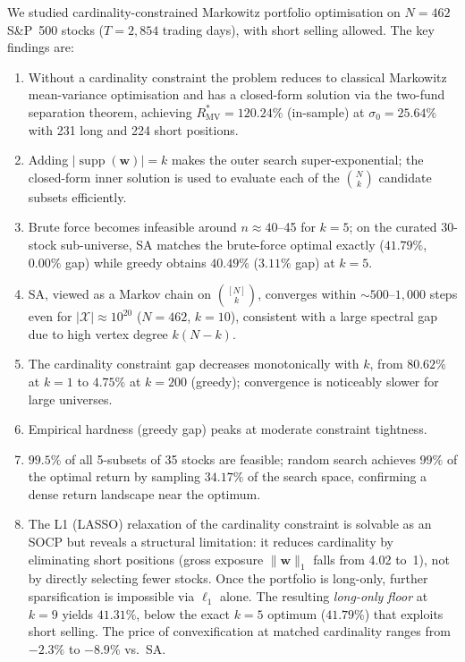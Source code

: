 \documentclass[11pt]{article}
\begin{document}
We studied cardinality-constrained Markowitz portfolio optimisation on $N=462$
S\&P~500 stocks ($T=2{,}854$ trading days), with short selling allowed.
The key findings are:
\begin{enumerate}[leftmargin=1.5em]
  \item Without a cardinality constraint the problem reduces to classical
    Markowitz mean-variance optimisation and has a closed-form solution via
    the two-fund separation theorem, achieving $R^*_{\text{MV}}=120.24\%$
    (in-sample) at $\sigma_0=25.64\%$ with 231 long and 224 short positions.
  \item Adding $|\operatorname{supp}(\mathbf{w})|=k$ makes the outer search
    super-exponential; the closed-form inner solution is used to evaluate
    each of the $\binom{N}{k}$ candidate subsets efficiently.
  \item Brute force becomes infeasible around $n\approx 40$--45 for $k=5$;
    on the curated 30-stock sub-universe, SA matches the brute-force optimal
    exactly ($41.79\%$, $0.00\%$ gap) while greedy obtains $40.49\%$
    ($3.11\%$ gap) at $k=5$.
  \item SA, viewed as a Markov chain on $\binom{[N]}{k}$, converges within
    $\sim\!500$--$1{,}000$ steps even for $|\mathcal{X}|\approx 10^{20}$
    ($N=462$, $k=10$), consistent with a large spectral gap due to high vertex
    degree $k(N-k)$.
  \item The cardinality constraint gap decreases monotonically with $k$, from
    $80.62\%$ at $k=1$ to $4.75\%$ at $k=200$ (greedy); convergence is
    noticeably slower for large universes.
  \item Empirical hardness (greedy gap) peaks at moderate constraint tightness.
  \item $99.5\%$ of all 5-subsets of 35 stocks are feasible; random search
    achieves $99\%$ of the optimal return by sampling $34.17\%$ of the search
    space, confirming a dense return landscape near the optimum.
  \item The L1 (LASSO) relaxation of the cardinality constraint is solvable as
    an SOCP but reveals a structural limitation: it reduces cardinality by
    eliminating short positions (gross exposure $\|\mathbf{w}\|_1$ falls from
    4.02 to~1), not by directly selecting fewer stocks.  Once the portfolio is
    long-only, further sparsification is impossible via $\ell_1$ alone.  The
    resulting \emph{long-only floor} at $k=9$ yields $41.31\%$, below the
    exact $k=5$ optimum ($41.79\%$) that exploits short selling.
    The price of convexification at matched cardinality ranges from $-2.3\%$
    to $-8.9\%$ vs.\ SA.
\end{enumerate}
\end{document}
